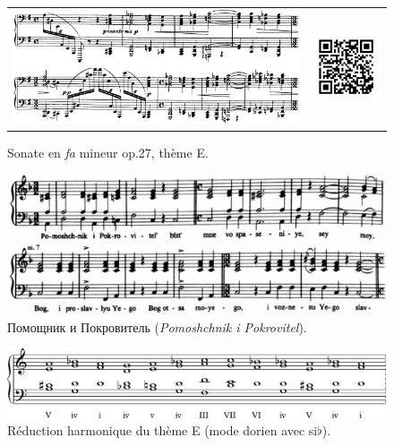 \begin{figure}[!p]
  \begin{bigcenter}
    \begin{tabular}{lr}
      \includegraphics[width=12.5cm, keepaspectratio]{sonate-theme-E.png}
      &
      \includegraphics[width=3cm, keepaspectratio]{op1-qr.png}
    \end{tabular}
  \end{bigcenter}
  \caption{\label{sonate-theme-5}Sonate en \emph{fa} mineur op.27, thème E.}
\end{figure}

\begin{figure}[!p]
  \begin{bigcenter}
    \includegraphics[width=15cm, keepaspectratio]{bortnyansky.png}
  \end{bigcenter}
  \caption{\label{bortnyansky}\foreignlanguage{russian}{Помощник и Покровитель} (\emph{Pomoshchnik i Pokrovitel}).}
\end{figure}

\begin{figure}[!p]
  \begin{bigcenter}
    \includegraphics[width=15cm, keepaspectratio]{religioso.pdf}
  \end{bigcenter}
  \caption{\label{sonate-theme-5-réduction}Réduction harmonique du thème E (mode dorien avec si$\flat$).}
\end{figure}

